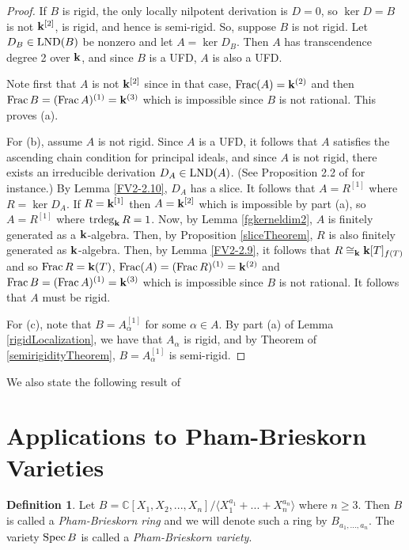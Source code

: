 \documentclass[12pt]{amsart}
\theoremstyle{plain}
\theoremstyle{definition}
\newtheorem{definition}[subsection]{Definition}
\newcommand{\Spec}{		\operatorname{{\rm Spec}}}
\newcommand{\trdeg}{	\operatorname{{\rm trdeg}}}
\newcommand{\Frac}{		\operatorname{{\rm Frac}}}
\newcommand{\lb}{\langle}
\newcommand{\rb}{\rangle}
\newcommand{\Comp}{\ensuremath{\mathbb{C}}}
\newcommand{\bk}{{\ensuremath{\rm \bf k}}}
\newcommand{\lnd}{\operatorname{{\rm LND}}}
\newcommand{\isom}{\cong}
\begin{document}
	\begin{proof}
		If $B$ is rigid, the only locally nilpotent derivation is $D = 0$, so $\ker D = B$ is not $\bk^{[2]}$, is rigid, and hence is semi-rigid. So, suppose $B$ is not rigid. Let $D_B \in \lnd(B)$ be nonzero and let $A = \ker D_B$. Then $A$ has transcendence degree 2 over $\bk$, and since $B$ is a UFD, $A$ is also a UFD. 
		
		Note first that $A$ is not $\bk^{[2]}$ since in that case, $\Frac(A) = \bk^{(2)}$ and then $\Frac B = (\Frac A)^{(1)} = \bk^{(3)}$ which is impossible since $B$ is not rational. This proves (a).
		
		For (b), assume $A$ is not rigid. Since $A$ is a UFD, it follows that $A$ satisfies the ascending chain condition for principal ideals, and since $A$ is not rigid, there exists an irreducible derivation $D_A \in \lnd(A)$. (See Proposition 2.2 of \cite{freudenburg2017algebraic} for instance.) By Lemma \ref{FV2-2.10}, $D_A$ has a slice. It follows that $A = R^{[1]}$ where $R = \ker D_A$. If $R = \bk^{[1]}$ then $A = \bk^{[2]}$ which is impossible by part (a), so $A = R^{[1]}$ where $\trdeg_\bk R = 1$. Now, by Lemma \ref{fgkerneldim2}, $A$ is finitely generated as a $\bk$-algebra. Then, by Proposition \ref{sliceTheorem}, $R$ is also finitely generated as $\bk$-algebra. Then, by Lemma \ref{FV2-2.9}, it follows that $R \isom_\bk \bk[T]_{f(T)}$ and so $\Frac R = \bk(T)$, $\Frac(A) = (\Frac R)^{(1)} = \bk^{(2)}$ and $\Frac B = (\Frac A)^{(1)} = \bk^{(3)}$ which is impossible since $B$ is not rational. It follows that $A$ must be rigid.
		
		For (c), note that $B = A_\alpha^{[1]}$ for some $\alpha \in A$. By part (a) of Lemma \ref{rigidLocalization}, we have that $A_\alpha$ is rigid, and by Theorem of \ref{semirigidityTheorem}, $B = A_\alpha^{[1]}$ is semi-rigid.      		
	\end{proof}
	
	We also state the following result of 
	
	\section{Applications to Pham-Brieskorn Varieties}
	
	\begin{definition}
		Let  $B = \Comp[X_1,X_2,...,X_n]/ \lb X_1^{a_1} + ... + X_n^{a_n} \rb$ where $n \geq 3$.  Then $B$ is called a \textit{Pham-Brieskorn ring} and we will denote such a ring by $B_{a_1, ..., a_n}$.  The variety $\Spec B$ is called a \textit{Pham-Brieskorn variety}.
	\end{definition}
	
\end{document}
